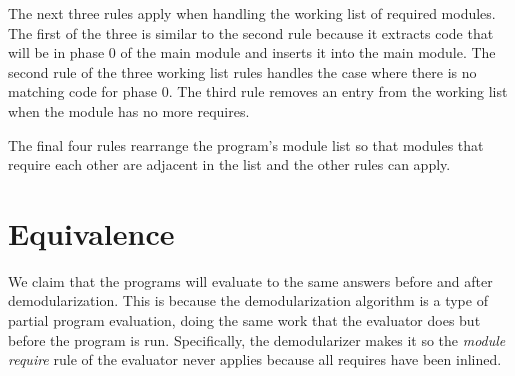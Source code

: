 The next three rules apply when handling the working list of required modules. 
The first of the three is similar to the second rule because it extracts code that will be in phase 0 of the main module and inserts it into the main module.
The second rule of the three working list rules handles the case where there is no matching code for phase 0.
The third rule removes an entry from the working list when the module has no more requires.

The final four rules rearrange the program's module list so that modules that require each other are adjacent in the list and the other rules can apply.

\section{Equivalence}
We claim that the programs will evaluate to the same answers before and after demodularization. 
This is because the demodularization algorithm is a type of partial program evaluation, doing the same work that the evaluator does but before the program is run.
Specifically, the demodularizer makes it so the \emph{module require} rule of the evaluator never applies because all requires have been inlined.

